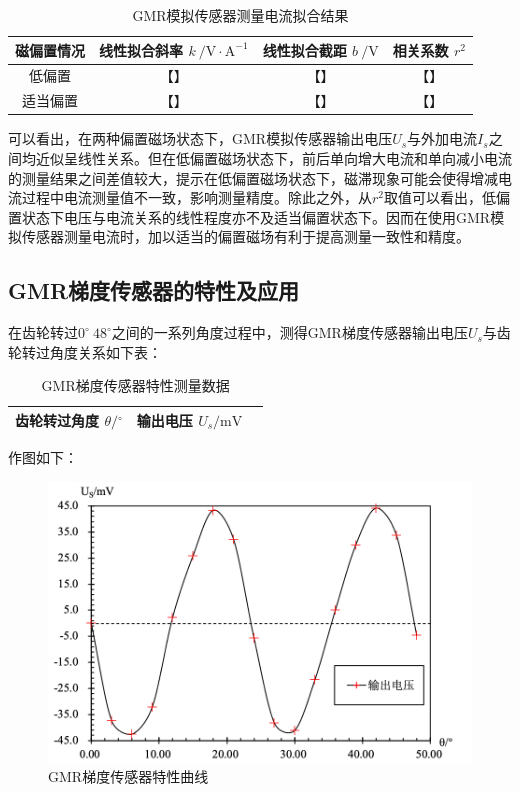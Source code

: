 \documentclass{thuemp}
\begin{document}
\begin{table}[H]
    \centering
    \captionnamefont{\wuhao\bf\heiti}
    \captiontitlefont{\wuhao\bf\heiti}
    \caption{GMR模拟传感器测量电流拟合结果} \label{tab:gmr_current_fit}
    \liuhao
    \begin{tabular}{|c|c|c|c|}
        \toprule
        磁偏置情况 & 线性拟合斜率 $k ~ /\mathrm{V\cdot A^{-1}} $ & 线性拟合截距 $b ~ /\mathrm{V}$ & 相关系数 $r^2$ \\ \hline
        低偏置 & 【】 & 【】 & 【】 \\ \hline
        适当偏置 & 【】 & 【】 & 【】 \\ \hline
        \midrule
        \bottomrule
    \end{tabular}
\end{table}

可以看出，在两种偏置磁场状态下，GMR模拟传感器输出电压$U_s$与外加电流$I_s$之间均近似呈线性关系。但在低偏置磁场状态下，前后单向增大电流和单向减小电流的测量结果之间差值较大，提示在低偏置磁场状态下，磁滞现象可能会使得增减电流过程中电流测量值不一致，影响测量精度。除此之外，从$r^2$取值可以看出，低偏置状态下电压与电流关系的线性程度亦不及适当偏置状态下。因而在使用GMR模拟传感器测量电流时，加以适当的偏置磁场有利于提高测量一致性和精度。

\subsection{GMR梯度传感器的特性及应用}

在齿轮转过$0^\circ~48^\circ$之间的一系列角度过程中，测得GMR梯度传感器输出电压$U_s$与齿轮转过角度关系如下表：

\begin{table}[H]
    \centering
    \captionnamefont{\wuhao\bf\heiti}
    \captiontitlefont{\wuhao\bf\heiti}
    \caption{GMR梯度传感器特性测量数据} \label{tab:gmr_gradient}
    \liuhao
    \begin{tabular}{|c|c|c|}
        \toprule
        齿轮转过角度 $\theta/\mathrm{^\circ}$ & 输出电压 $U_s/\mathrm{mV}$ \\ \hline
        \midrule
        \bottomrule
    \end{tabular}
\end{table}

作图如下：

\begin{figure}[H]
    \centering
    \includegraphics[width=0.8\linewidth]{../Data/GMR-Plot-05-excel.png}
    \caption{GMR梯度传感器特性曲线} \label{fig:gmr_gradient}
\end{figure}
\end{document}
